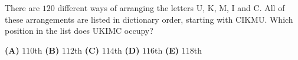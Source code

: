 There are $120$ different ways of arranging the letters U, K, M, I and C. All of these arrangements are listed in dictionary order, starting with CIKMU. Which position in the list does UKIMC occupy?

\textbf{(A)} $110$th \qquad \textbf{(B)} $112$th \qquad \textbf{(C)} $114$th \qquad \textbf{(D)} $116$th \qquad \textbf{(E)} $118$th
